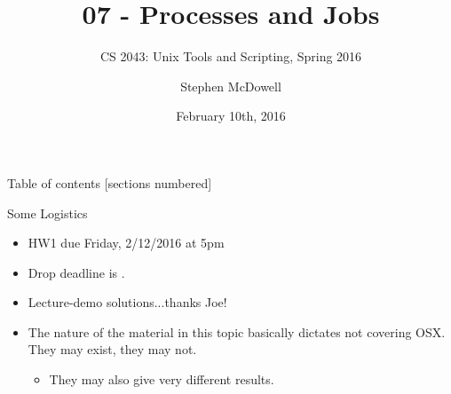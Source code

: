 %
%
%
%


%
%
\title{07 \-- Processes and Jobs}
\subtitle{CS 2043: Unix Tools and Scripting, Spring 2016 \cite{prevSemesters}}
\date{February 10th, 2016}
\author{Stephen McDowell}


\maketitle

\begin{frame}{Table of contents}
  [sections numbered]
  \tableofcontents[hideallsubsections]
\end{frame}

\begin{frame}{Some Logistics}
  \begin{itemize}[<+- | alert@+>]
    \item HW1 due Friday, 2/12/2016 at 5pm
    \item Drop deadline is .
    \item Lecture-demo solutions...thanks Joe!
    \item The nature of the material in this topic basically dictates not covering OSX.  They may exist, they
          may not.
    \begin{itemize}[<+- | alert@+>]
      \item They may also give very different results.
    \end{itemize}
  \end{itemize}
\end{frame}

